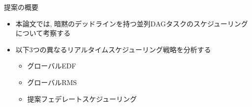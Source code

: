 
\begin{frame}{提案の概要}
    \begin{itemize}
        \item 本論文では, 暗黙のデッドラインを持つ並列DAGタスクのスケジューリングについて考察する
        \item 以下3つの異なるリアルタイムスケジューリング戦略を分析する
        \begin{itemize}
            \item グローバルEDF
            \item グローバルRMS
            \item 提案フェデレートスケジューリング
        \end{itemize}
    \end{itemize}
\end{frame}

